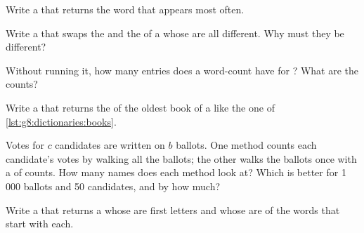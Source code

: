 \begin{exercise}[$\star\star$]\label{exo:g8:dictionaries:7}
Write a   that returns the word that
appears most often.
\end{exercise}

\begin{exercise}[$\star\star$]\label{exo:g8:dictionaries:8}
Write a   that swaps the  and the  of a
 whose  are all different. Why must they be different?
\end{exercise}

\begin{exercise}[$\star\star$]\label{exo:g8:dictionaries:9}
Without running it, how many entries does a word-count  have for
? What are the counts?
\end{exercise}

\begin{exercise}[$\star\star\star$]\label{exo:g8:dictionaries:10}
Write a   that returns the  of the oldest
book of a  like the one of \cref{lst:g8:dictionaries:books}.
\end{exercise}

\begin{exercise}[$\star\star\star$]\label{exo:g8:dictionaries:11}
Votes for $c$ candidates are written on $b$ ballots. One method counts each
candidate's votes by walking all the ballots; the other walks the ballots once
with a  of counts. How many names does each method look at? Which
is better for 1\,000 ballots and 50 candidates, and by how much?
\end{exercise}

\begin{exercise}[$\star\star\star$]\label{exo:g8:dictionaries:12}
Write a   that returns a 
whose  are first letters and whose  are  of the words that
start with each.
\end{exercise}

